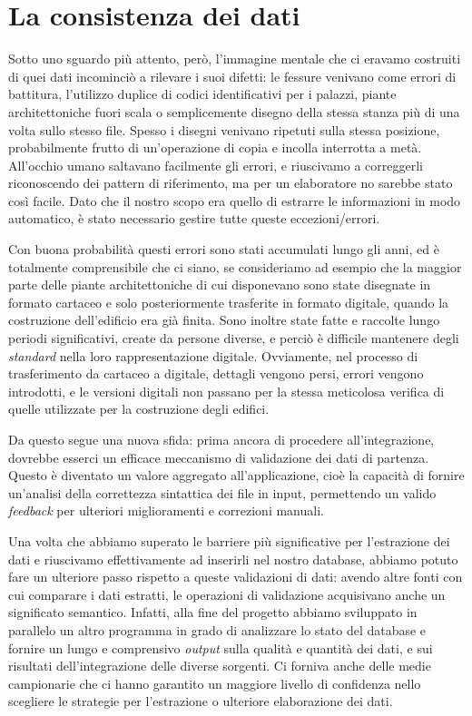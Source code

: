 \documentclass[12pt]{report}
\begin{document}
\section{La consistenza dei dati}

Sotto uno sguardo più attento, però, l'immagine mentale che ci eravamo
costruiti di quei dati incominciò a rilevare i suoi difetti: le
fessure venivano come errori di battitura, l'utilizzo duplice di
codici identificativi per i palazzi, piante architettoniche fuori
scala o semplicemente disegno della stessa stanza più di una volta
sullo stesso file. Spesso i disegni venivano ripetuti sulla stessa
posizione, probabilmente frutto di un'operazione di copia e incolla
interrotta a metà. All'occhio umano saltavano facilmente gli errori, e
riuscivamo a correggerli riconoscendo dei pattern di riferimento, ma per un
elaboratore no sarebbe stato così facile. Dato che il nostro scopo era 
quello di estrarre le informazioni in modo automatico, 
è stato necessario gestire tutte queste eccezioni/errori.

Con buona probabilità questi errori sono stati accumulati lungo gli
anni, ed è totalmente comprensibile che ci siano, se  consideriamo ad
esempio che la maggior parte delle piante architettoniche di cui
disponevano sono state disegnate in formato cartaceo e solo posteriormente
trasferite in formato digitale, quando la costruzione dell'edificio era già
finita. Sono inoltre state fatte e raccolte lungo periodi significativi,
create da persone diverse, e perciò è difficile mantenere degli
\textit{standard} nella loro rappresentazione digitale. Ovviamente, nel
processo di trasferimento da cartaceo a digitale, dettagli vengono persi,
errori vengono introdotti, e le versioni digitali non passano per la stessa
meticolosa verifica di quelle utilizzate per la costruzione degli edifici. 

Da questo segue una nuova sfida: prima ancora di procedere all'integrazione,
dovrebbe esserci un efficace meccanismo di validazione dei dati di partenza.
Questo è diventato un valore aggregato all'applicazione, cioè la capacità di
fornire un'analisi della correttezza sintattica dei file in input, permettendo
un valido \textit{feedback} per ulteriori miglioramenti e correzioni manuali.

Una volta che abbiamo superato le barriere più significative per l'estrazione 
dei dati e riuscivamo effettivamente ad inserirli nel nostro 
database, abbiamo potuto fare un ulteriore passo rispetto a 
queste validazioni di dati: avendo altre fonti con cui comparare i dati
estratti, le operazioni di validazione acquisivano anche un significato
semantico. Infatti, alla fine del progetto abbiamo sviluppato in parallelo
un altro programma in grado di analizzare lo stato del database 
e fornire un lungo e comprensivo \textit{output} sulla 
qualità e quantità dei dati, e sui risultati dell'integrazione delle 
diverse sorgenti. Ci forniva anche delle medie campionarie che ci hanno 
garantito un maggiore livello di confidenza nello scegliere le
strategie per l'estrazione o ulteriore elaborazione dei dati.
\end{document}
